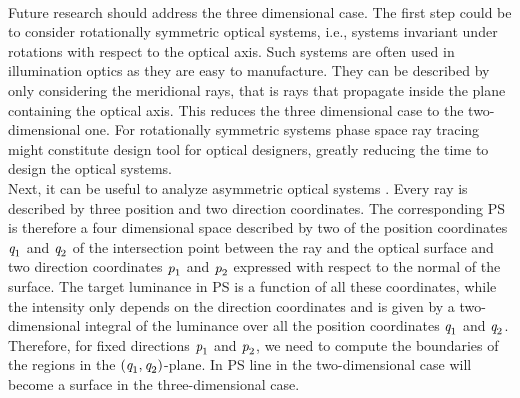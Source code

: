  \\ \indent 
Future research should address the three dimensional case. The first step could be to consider rotationally symmetric optical systems, i.e., systems invariant under rotations with respect to the optical axis. Such systems are often used in illumination optics as they are easy to manufacture. They can be described by only considering the meridional rays, that is rays that propagate inside the plane containing the optical axis. This reduces the three dimensional case to the two-dimensional one. 
For rotationally symmetric systems phase space ray tracing might constitute design tool for optical designers, greatly reducing the time to design the optical systems. 
\\ \indent  Next, it can be useful to analyze asymmetric optical systems \cite{ries1997performance}. Every ray is described by three position and two direction coordinates. The corresponding PS is therefore a four dimensional space described by two of the position coordinates $\textit{q}_1$ and $\textit{q}_2$ of the intersection point between the ray and the optical surface and two direction coordinates $\textit{p}_1$ and $\textit{p}_2$ expressed with respect to the normal of the surface. 
The target luminance in PS is a function of all these coordinates, while the intensity only depends on the direction coordinates and is given by a two-dimensional integral of the luminance over all the position coordinates $\textit{q}_1$ and $\textit{q}_2$. 
Therefore, for fixed directions $\textit{p}_1$ and $\textit{p}_2$, we need to compute the boundaries of the regions in the $(\textit{q}_1, \textit{q}_2)$-plane. In PS line in the two-dimensional case will become a surface in the three-dimensional case. 

